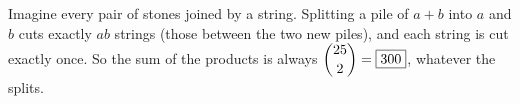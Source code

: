 Imagine every pair of stones joined by a string. Splitting a pile of $a+b$ into $a$ and $b$ cuts exactly $ab$ strings (those between the two new piles), and each string is cut exactly once. So the sum of the products is always $\dbinom{25}{2}=\boxed{300}$, whatever the splits.
